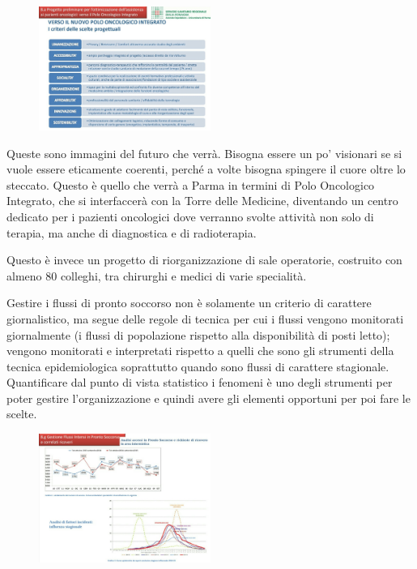  \begin{figure}[!ht]
\centering
	\includegraphics[width=0.5\textwidth]{32/image25.jpeg}
	\end{figure}

Queste sono immagini del futuro che verrà. Bisogna essere un po'
visionari se si vuole essere eticamente coerenti, perché a volte bisogna
spingere il cuore oltre lo steccato. Questo è quello che verrà a Parma
in termini di Polo Oncologico Integrato, che si interfaccerà con la
Torre delle Medicine, diventando un centro dedicato per i pazienti
oncologici dove verranno svolte attività non solo di terapia, ma anche
di diagnostica e di radioterapia.

Questo è invece un progetto di riorganizzazione di sale operatorie,
costruito con almeno 80 colleghi, tra chirurghi e medici di varie
specialità.

Gestire i flussi di pronto soccorso non è solamente un criterio di
carattere giornalistico, ma segue delle regole di tecnica per cui i
flussi vengono monitorati giornalmente (i flussi di popolazione rispetto
alla disponibilità di posti letto); vengono monitorati e interpretati
rispetto a quelli che sono gli strumenti della tecnica epidemiologica
soprattutto quando sono flussi di carattere stagionale. Quantificare dal
punto di vista statistico i fenomeni è uno degli strumenti per poter
gestire l'organizzazione e quindi avere gli elementi opportuni per poi
fare le scelte.

 \begin{figure}[!ht]
\centering
	\includegraphics[width=0.5\textwidth]{32/image26.jpeg}
	\end{figure}

